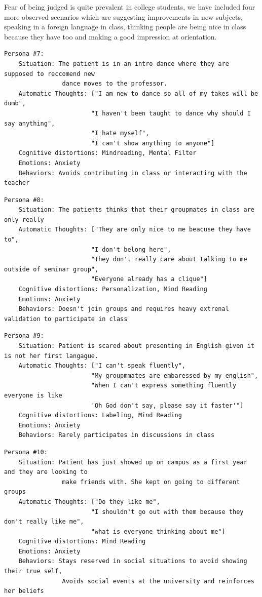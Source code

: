 \documentclass[twoside]{report}
\begin{document}
Fear of being judged is quite prevalent in college students, we have included four more observed scenarios which are suggesting improvements in new subjects, speaking in a foreign language in class, thinking people are being nice in class because they have too and making a good impression at orientation.

\begin{verbatim}
Persona #7:
    Situation: The patient is in an intro dance where they are supposed to reccomend new 
                dance moves to the professor.
    Automatic Thoughts: ["I am new to dance so all of my takes will be dumb",
                        "I haven't been taught to dance why should I say anything",
                        "I hate myself",
                        "I can't show anything to anyone"]
    Cognitive distortions: Mindreading, Mental Filter
    Emotions: Anxiety
    Behaviors: Avoids contributing in class or interacting with the teacher
\end{verbatim}
\begin{verbatim}
Persona #8:
    Situation: The patients thinks that their groupmates in class are only really  
    Automatic Thoughts: ["They are only nice to me beacuse they have to",
                        "I don't belong here",
                        "They don't really care about talking to me outside of seminar group",
                        "Everyone already has a clique"]
    Cognitive distortions: Personalization, Mind Reading
    Emotions: Anxiety
    Behaviors: Doesn't join groups and requires heavy extrenal validation to participate in class
\end{verbatim}
\begin{verbatim}
Persona #9:
    Situation: Patient is scared about presenting in English given it is not her first langague.
    Automatic Thoughts: ["I can't speak fluently",
                        "My groupmmates are embaressed by my english",
                        "When I can't express something fluently everyone is like
                        'Oh God don't say, please say it faster'"]
    Cognitive distortions: Labeling, Mind Reading
    Emotions: Anxiety
    Behaviors: Rarely participates in discussions in class
\end{verbatim}
\begin{verbatim}
Persona #10:
    Situation: Patient has just showed up on campus as a first year and they are looking to 
                make friends with. She kept on going to different groups
    Automatic Thoughts: ["Do they like me",
                        "I shouldn't go out with them because they don't really like me",
                        "what is everyone thinking about me"]
    Cognitive distortions: Mind Reading
    Emotions: Anxiety
    Behaviors: Stays reserved in social situations to avoid showing their true self, 
                Avoids social events at the university and reinforces her beliefs
\end{verbatim}
\end{document}
